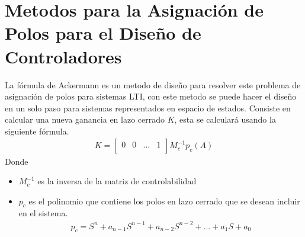 \documentclass[12pt]{article}
\begin{document}
\section{Metodos para la Asignación de Polos para el Diseño de Controladores}
La fórmula de Ackermann es un metodo de diseño para resolver este problema de asignación de polos para sistemas LTI, con este metodo se puede hacer el diseño en un solo paso para sistemas representados en espacio de estados.
Consiste en calcular una nueva ganancia en lazo cerrado $K$, esta se calculará usando la siguiente fórmula.
\begin{equation}
    \begin{split}
        K=
        \begin{bmatrix}
            0 & 0 & ... & 1\\
        \end{bmatrix}
        M^{-1}_{c}p_{c}(A)
    \end{split}
    \label{eq:ackermann}
\end{equation}
Donde 
\begin{itemize}
    \item $M^{-1}_{c}$ es la inversa de la matriz de controlabilidad
    \item $p_{c}$ es el polinomio que contiene los polos en lazo cerrado que se desean incluir en el sistema.
    \begin{equation}
        \begin{split}
            p_{c}=S^{n}+a_{n-1}S^{n-1}+a_{n-2}S^{n-2}+...+a_{1}S+a_{0}
        \end{split}
        \label{eq:polo_closed_loop}
    \end{equation} 
\end{itemize}
\end{document}
